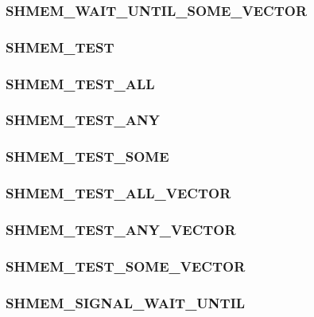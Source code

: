 \documentclass[10pt]{book}
\begin{document}
\subsubsection{\textbf{SHMEM\_WAIT\_UNTIL\_SOME\_VECTOR}}\label{subsec:shmem_wait_until_some_vector}


\subsubsection{\textbf{SHMEM\_TEST}}\label{subsec:shmem_test}


\subsubsection{\textbf{SHMEM\_TEST\_ALL}}\label{subsec:shmem_test_all}


\subsubsection{\textbf{SHMEM\_TEST\_ANY}}\label{subsec:shmem_test_any}


\subsubsection{\textbf{SHMEM\_TEST\_SOME}}\label{subsec:shmem_test_some}


\subsubsection{\textbf{SHMEM\_TEST\_ALL\_VECTOR}}\label{subsec:shmem_test_all_vector}


\subsubsection{\textbf{SHMEM\_TEST\_ANY\_VECTOR}}\label{subsec:shmem_test_any_vector}


\subsubsection{\textbf{SHMEM\_TEST\_SOME\_VECTOR}}\label{subsec:shmem_test_some_vector}


\subsubsection{\textbf{SHMEM\_SIGNAL\_WAIT\_UNTIL}}\label{subsec:shmem_signal_wait_until}

\end{document}
